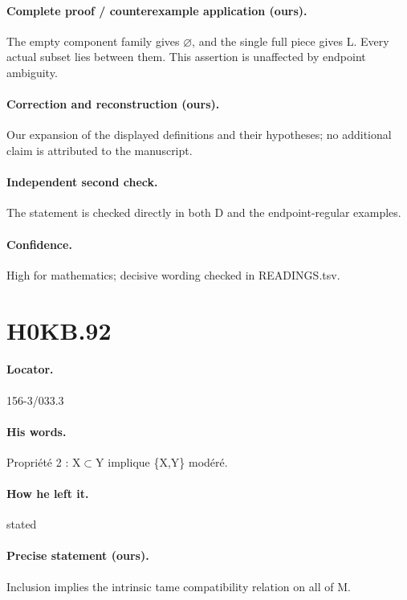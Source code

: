 \paragraph{Complete proof / counterexample application (ours).} The empty component family gives \ensuremath{\varnothing}, and the single full piece gives L. Every actual subset lies between them. This assertion is unaffected by endpoint ambiguity.

\paragraph{Correction and reconstruction (ours).} Our expansion of the displayed definitions and their hypotheses; no additional claim is attributed to the manuscript.

\paragraph{Independent second check.} The statement is checked directly in both D and the endpoint-regular examples.

\paragraph{Confidence.} High for mathematics; decisive wording checked in READINGS.tsv.

\section*{H0KB.92}\label{statement:H0KB.92}
\paragraph{Locator.} 156-3/033.3

\paragraph{His words.} Propriété 2 : X\ensuremath{\subset}Y implique \{X,Y\} modéré.

\paragraph{How he left it.} stated

\paragraph{Precise statement (ours).} Inclusion implies the intrinsic tame compatibility relation on all of M.

